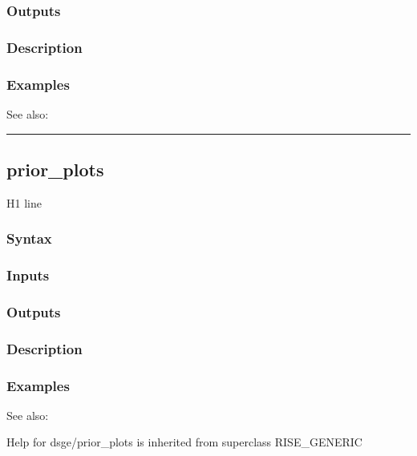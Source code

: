 \documentclass[letterpaper,10pt,english]{sphinxmanual}
\begin{document}
\subsubsection{Outputs}
\label{classes/models/@dsge/dsge:id129}

\subsubsection{Description}
\label{classes/models/@dsge/dsge:id130}

\subsubsection{Examples}
\label{classes/models/@dsge/dsge:id131}
See also:


\bigskip\hrule{}\bigskip



\subsection{prior\_plots}
\label{classes/models/@dsge/dsge:id132}\label{classes/models/@dsge/dsge:prior-plots}
H1 line


\subsubsection{Syntax}
\label{classes/models/@dsge/dsge:id133}

\subsubsection{Inputs}
\label{classes/models/@dsge/dsge:id134}

\subsubsection{Outputs}
\label{classes/models/@dsge/dsge:id135}

\subsubsection{Description}
\label{classes/models/@dsge/dsge:id136}

\subsubsection{Examples}
\label{classes/models/@dsge/dsge:id137}
See also:

Help for dsge/prior\_plots is inherited from superclass RISE\_GENERIC
\end{document}

